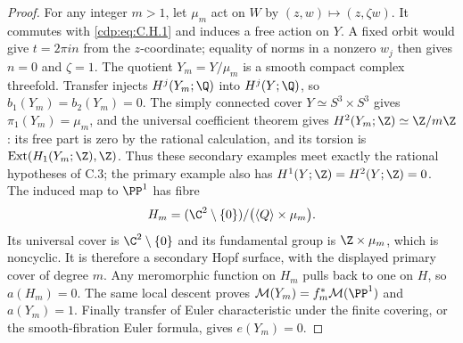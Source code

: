 \begin{proof}
For any integer $m>1$, let $\mu_m$ act on $W$ by
$(z,w)\mapsto(z,\zeta w)$. It commutes with \eqref{cdp:eq:C.H.1} and induces
a free action on $Y$. A fixed orbit would give $t=2\pi in$ from
the $z$-coordinate; equality of norms in a nonzero $w_j$ then
gives $n=0$ and $\zeta=1$. The quotient
$Y_m=Y/\mu_m$ is a smooth compact complex threefold. Transfer
injects $H^j(Y_m;\Q)$ into $H^j(Y;\Q)$, so $b_1(Y_m)=b_2(Y_m)=0$.
The simply connected cover $Y\simeq S^3\times S^3$ gives
$\pi_1(Y_m)=\mu_m$, and the universal coefficient theorem gives
$H^2(Y_m;\Z)\simeq\Z/m\Z$: its free part is zero by the
rational calculation, and its torsion is
$\operatorname{Ext}(H_1(Y_m;\Z),\Z)$. Thus these secondary
examples meet exactly the rational hypotheses of C.3; the primary
example also has $H^1(Y;\Z)=H^2(Y;\Z)=0$.
The induced map to $\PP^1$ has fibre
\[
H_m=(\C^2\setminus\{0\})/
       \bigl(\langle Q\rangle\times\mu_m\bigr).
\]
Its universal cover is $\C^2\setminus\{0\}$ and its fundamental
group is $\Z\times\mu_m$, which is noncyclic. It is therefore a
secondary Hopf surface, with the displayed primary cover of degree
$m$. Any meromorphic function on $H_m$ pulls back to one on $H$,
so $a(H_m)=0$. The same local descent proves
$\mathcal M(Y_m)=f_m^*\mathcal M(\PP^1)$ and $a(Y_m)=1$.
Finally transfer of Euler characteristic under the finite covering,
or the smooth-fibration Euler formula, gives $e(Y_m)=0$.
\end{proof}


